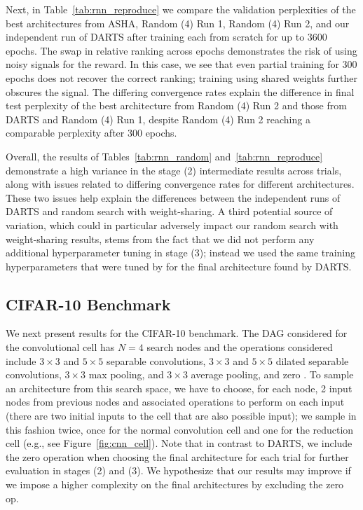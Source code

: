 \documentclass[acmlarge, nonacm]{acmart}
\begin{document}
Next, in Table~\ref{tab:rnn_reproduce} we compare the validation perplexities of 
the best architectures from ASHA, Random (4) Run 1, Random (4) Run 2, and our independent run of DARTS after
training each from scratch for up to 3600 epochs.  The swap in relative ranking across epochs demonstrates the risk of using noisy signals for the reward. In this case, we see that even partial training for 300 epochs does not recover the correct ranking; training using shared weights further obscures the signal. The differing convergence rates explain the difference in final test perplexity of the best architecture from Random (4) Run 2 and those from DARTS and Random (4) Run 1, despite Random (4) Run 2 reaching a comparable perplexity after 300 epochs. 

Overall, the results of Tables~\ref{tab:rnn_random} and~\ref{tab:rnn_reproduce} demonstrate a high variance in the stage (2) intermediate results across trials, along with issues related to differing convergence rates for different architectures. These two issues help explain the differences between the independent runs of DARTS and random search with weight-sharing.  A third potential source of variation, which could in particular adversely impact our random search with weight-sharing results, stems from the fact that we did not perform any additional hyperparameter tuning in stage (3); instead we used the same training hyperparameters that were tuned by \citet{liu2018darts} for the final architecture found by DARTS.

\subsection{CIFAR-10 Benchmark}
\label{ssec:cnn}
We next present results for the CIFAR-10 benchmark. The DAG considered for the convolutional cell has $N=4$ search nodes and the operations considered include $3\times 3$ and $5\times 5$ separable convolutions, $3\times 3$ and $5\times 5$ dilated separable convolutions, $3\times 3$ max pooling, and $3\times 3$ average pooling, and zero \citep{liu2018darts}.  To sample an architecture from this search space, we have to choose, for each node, 2 input nodes from previous nodes and associated operations to perform on each input (there are two initial inputs to the cell that are also possible input); we sample in this fashion twice, once for the normal convolution cell and one for the reduction cell (e.g., see Figure~\ref{fig:cnn_cell}).  Note that in contrast to DARTS, we include the zero operation when choosing the final architecture for each trial for further evaluation in stages (2) and (3).  We hypothesize that our results may improve if we impose a higher complexity on the final architectures by excluding the zero op.  
\end{document}
